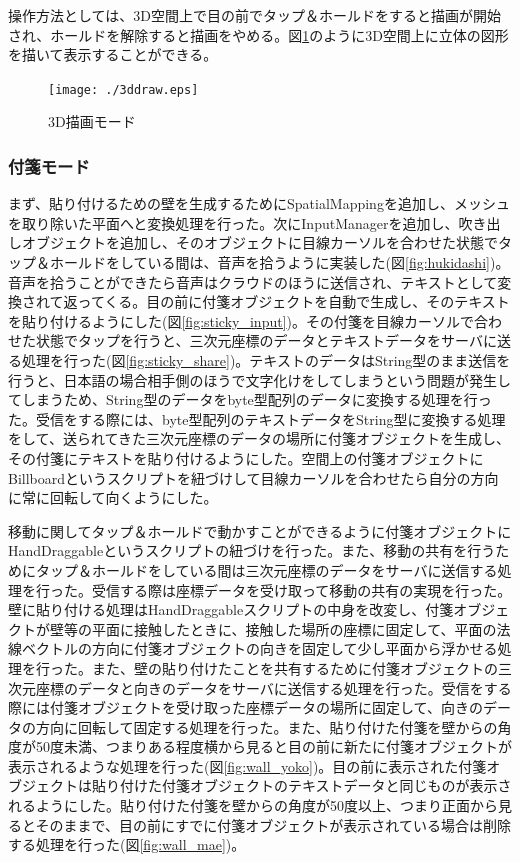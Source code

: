 \documentclass[11pt,a4j, titlepage]{jarticle} %
\begin{document}
操作方法としては、3D空間上で目の前でタップ＆ホールドをすると描画が開始され、ホールドを解除すると描画をやめる。図\ref{fig:3ddraw}のように3D空間上に立体の図形を描いて表示することができる。

\begin{figure}[H]
  \begin{center}
    \texttt{[image: ./3ddraw.eps]}
    \caption{3D描画モード}
    \label{fig:3ddraw}
  \end{center}
\end{figure}

\subsubsection{付箋モード}
まず、貼り付けるための壁を生成するためにSpatialMappingを追加し、メッシュを取り除いた平面へと変換処理を行った\cite{holograms230}。次にInputManagerを追加し、吹き出しオブジェクトを追加し、そのオブジェクトに目線カーソルを合わせた状態でタップ＆ホールドをしている間は、音声を拾うように実装した(図\ref{fig:hukidashi})。音声を拾うことができたら音声はクラウドのほうに送信され、テキストとして変換されて返ってくる。目の前に付箋オブジェクトを自動で生成し、そのテキストを貼り付けるようにした(図\ref{fig:sticky_input})。その付箋を目線カーソルで合わせた状態でタップを行うと、三次元座標のデータとテキストデータをサーバに送る処理を行った(図\ref{fig:sticky_share})。テキストのデータはString型のまま送信を行うと、日本語の場合相手側のほうで文字化けをしてしまうという問題が発生してしまうため、String型のデータをbyte型配列のデータに変換する処理を行った。受信をする際には、byte型配列のテキストデータをString型に変換する処理をして、送られてきた三次元座標のデータの場所に付箋オブジェクトを生成し、その付箋にテキストを貼り付けるようにした。空間上の付箋オブジェクトにBillboardというスクリプトを紐づけして目線カーソルを合わせたら自分の方向に常に回転して向くようにした。

移動に関してタップ＆ホールドで動かすことができるように付箋オブジェクトにHandDraggableというスクリプトの紐づけを行った。また、移動の共有を行うためにタップ＆ホールドをしている間は三次元座標のデータをサーバに送信する処理を行った。受信する際は座標データを受け取って移動の共有の実現を行った。壁に貼り付ける処理はHandDraggableスクリプトの中身を改変し、付箋オブジェクトが壁等の平面に接触したときに、接触した場所の座標に固定して、平面の法線ベクトルの方向に付箋オブジェクトの向きを固定して少し平面から浮かせる処理を行った。また、壁の貼り付けたことを共有するために付箋オブジェクトの三次元座標のデータと向きのデータをサーバに送信する処理を行った。受信をする際には付箋オブジェクトを受け取った座標データの場所に固定して、向きのデータの方向に回転して固定する処理を行った。また、貼り付けた付箋を壁からの角度が50度未満、つまりある程度横から見ると目の前に新たに付箋オブジェクトが表示されるような処理を行った(図\ref{fig:wall_yoko})。目の前に表示された付箋オブジェクトは貼り付けた付箋オブジェクトのテキストデータと同じものが表示されるようにした。貼り付けた付箋を壁からの角度が50度以上、つまり正面から見るとそのままで、目の前にすでに付箋オブジェクトが表示されている場合は削除する処理を行った(図\ref{fig:wall_mae})。
\end{document}
